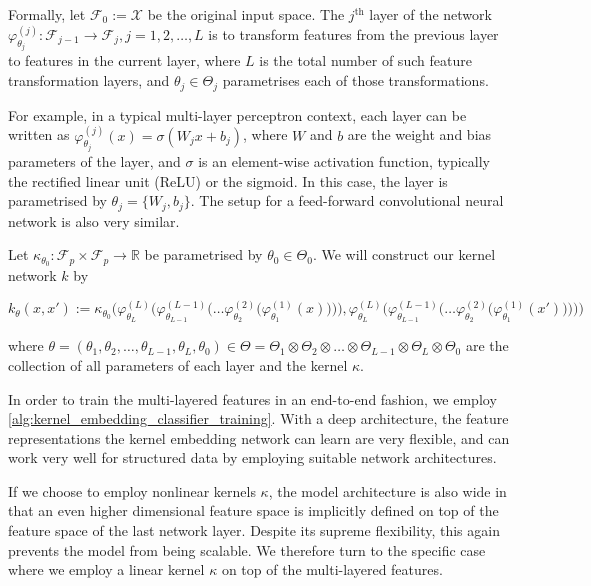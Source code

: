 \documentclass{article}
\begin{document}
		Formally, let $\mathcal{F}_{0} := \mathcal{X}$ be the original input space. The $j^{\mathrm{th}}$ layer of the network $\varphi^{(j)}_{\theta_{j}} : \mathcal{F}_{j - 1} \to \mathcal{F}_{j}, j = 1, 2, \dots, L$ is to transform features from the previous layer to features in the current layer, where $L$ is the total number of such feature transformation layers, and $\theta_{j} \in \Theta_{j}$ parametrises each of those transformations.
		
		For example, in a typical multi-layer perceptron context, each layer can be written as $\varphi^{(j)}_{\theta_{j}}(x) = \sigma(W_{j} x + b_{j})$, where $W$ and $b$ are the weight and bias parameters of the layer, and $\sigma$ is an element-wise activation function, typically the rectified linear unit (ReLU) or the sigmoid. In this case, the layer is parametrised by $\theta_{j} = \{W_{j}, b_{j}\}$. The setup for a feed-forward convolutional neural network is also very similar.
		
		Let $\kappa_{\theta_{0}} : \mathcal{F}_{p} \times \mathcal{F}_{p} \to \mathbb{R}$ be parametrised by $\theta_{0} \in \Theta_{0}$. We will construct our kernel network $k$ by
		
		\begin{equation}
			k_{\theta}(x, x') := \kappa_{\theta_{0}}\Bigg( \varphi^{(L)}_{\theta_{L}}\bigg(\varphi^{(L - 1)}_{\theta_{L - 1}}\Big(\dots\varphi^{(2)}_{\theta_{2}}\big(\varphi^{(1)}_{\theta_{1}}(x)\big)\Big)\bigg), \varphi^{(L)}_{\theta_{L}}\bigg(\varphi^{(L - 1)}_{\theta_{L - 1}}\Big(\dots\varphi^{(2)}_{\theta_{2}}\big(\varphi^{(1)}_{\theta_{1}}(x')\big)\Big)\bigg) \Bigg)
		\label{eq:deep_kernel_embedding_network}
		\end{equation}
		
		where $\theta = (\theta_{1}, \theta_{2}, \dots, \theta_{L -1}, \theta_{L}, \theta_{0}) \in \Theta = \Theta_{1} \otimes \Theta_{2} \otimes \dots \otimes \Theta_{L - 1} \otimes \Theta_{L} \otimes \Theta_{0}$ are the collection of all parameters of each layer and the kernel $\kappa$.
		
		In order to train the multi-layered features in an end-to-end fashion, we employ \cref{alg:kernel_embedding_classifier_training}. With a deep architecture, the feature representations the kernel embedding network can learn are very flexible, and can work very well for structured data by employing suitable network architectures.
		
		If we choose to employ nonlinear kernels $\kappa$, the model architecture is also wide in that an even higher dimensional feature space is implicitly defined on top of the feature space of the last network layer. Despite its supreme flexibility, this again prevents the model from being scalable. We therefore turn to the specific case where we employ a linear kernel $\kappa$ on top of the multi-layered features.
\end{document}
